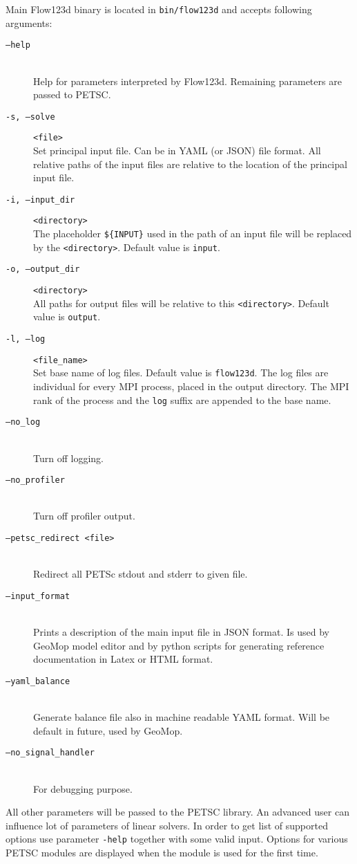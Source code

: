 \documentclass[12pt,a4paper]{report}
\begin{document}
Main Flow123d binary is located in \verb'bin/flow123d' and accepts following arguments:


\begin{description}
 \item[{\tt --help}] \hfill\\
        Help for parameters interpreted by Flow123d. Remaining parameters are passed to PETSC.
 \item[ {\tt -s, --solve} ] \verb'<file>' \hfill\\
 	 Set principal input file. Can be in YAML (or  JSON) file format. All relative paths of the input 
 	 files are relative to the location of the principal input file.
 \item[{\tt -i, --input\_dir}] \verb'<directory>' \hfill\\
 	The placeholder \verb"${INPUT}" %
  	used in the path of an input file will be replaced by the \verb'<directory>'. Default value is \verb'input'.
 \item[{\tt -o, --output\_dir}] \verb'<directory>' \hfill\\
 	All paths for output files will be relative to this \verb'<directory>'. Default value is \verb'output'.
 \item[{\tt -l, --log}] \verb'<file_name>' \hfill\\
 	Set base name of log files. Default value is \verb'flow123d'. The log files are individual for every MPI process, placed in the output directory. 
 	The MPI rank of the process and the \verb'log' suffix are appended to the base name.
 \item[{\tt --no\_log}] \hfill\\
        Turn off logging.
 \item[{\tt --no\_profiler}] \hfill\\
        Turn off profiler output.
 \item[{\tt --petsc\_redirect <file>}] \hfill\\
        Redirect all PETSc stdout and stderr to given file.       
 \item[{\tt --input\_format}] \hfill\\ 
        Prints a description of the main input file in JSON format. Is used by GeoMop model editor and by python scripts for 
        generating reference documentation in Latex or HTML format.
 \item[{\tt --yaml\_balance}] \hfill\\
        Generate balance file also in machine readable YAML format. Will be default in future, used by GeoMop.
 \item[{\tt --no\_signal\_handler}] \hfill\\
        For debugging purpose.
        
\end{description}
All other parameters will be passed to the PETSC library. An advanced user can influence lot of parameters of linear solvers. In order to get list of supported options 
use parameter \verb'-help' together with some valid input. Options for various PETSC modules are displayed when the module is used for the first time.
\end{document}
